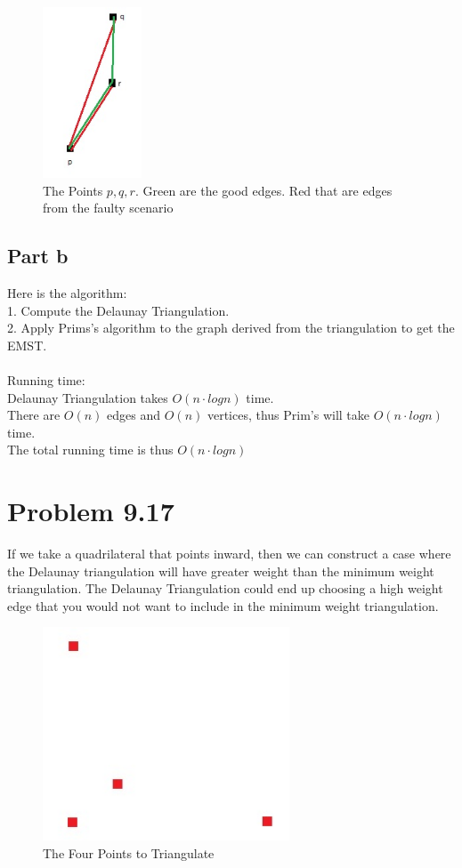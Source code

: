 \documentclass[11pt,psfig]{article}
\begin{document}
\begin{figure}[H]
\centering
\includegraphics[height=2in]{hw7prob2diagram.jpg}
\caption{The Points $p,q,r$. Green are the good edges. Red that are edges from the faulty scenario}
\end{figure} 

\subsection*{Part b}
Here is the algorithm:\\
1. Compute the Delaunay Triangulation. \\
2. Apply Prims's algorithm to the graph derived from the triangulation to get the EMST.\\
\\
Running time:\\
Delaunay Triangulation takes $O(n \cdot logn)$ time.\\
There are $O(n)$ edges and $O(n)$ vertices, thus Prim's will take $O(n \cdot logn)$ time. \\
The total running time is thus $O(n \cdot logn)$\\

\newpage

\section*{Problem 9.17}

If we take a quadrilateral that points inward, then we can construct a case where the Delaunay triangulation will have greater weight than the minimum weight triangulation. The Delaunay Triangulation could end up choosing a high weight edge that you would not want to include in the minimum weight triangulation. 

\begin{figure}[H]
\centering
\includegraphics[height=2.5in]{hw7prob3diagram1.jpg}
\caption{The Four Points to Triangulate}
\end{figure}
\end{document}
